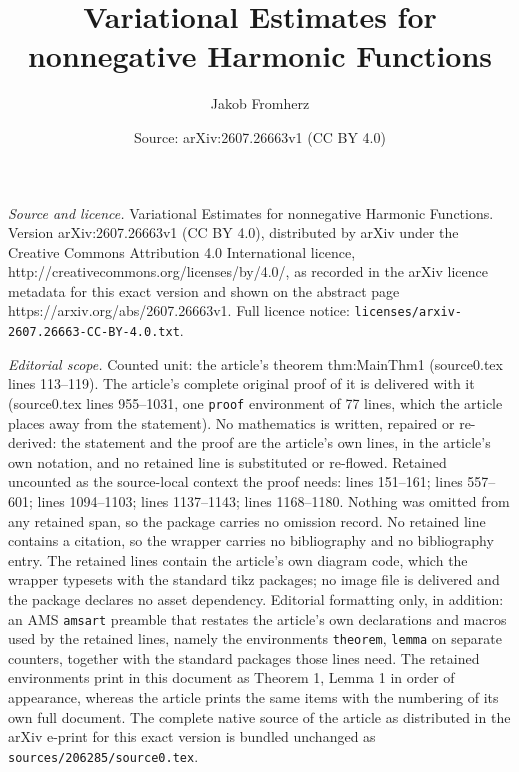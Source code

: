 \documentclass[10pt,a4paper]{amsart}
\title{Variational Estimates for nonnegative Harmonic Functions}
\author{Jakob Fromherz}
\date{Source: arXiv:2607.26663v1 (CC BY 4.0)}
\begin{document}
\maketitle

\noindent\emph{Source and licence.} Variational Estimates for nonnegative Harmonic Functions. Version arXiv:2607.26663v1 (CC BY 4.0), distributed by arXiv under the Creative Commons Attribution 4.0 International licence, http://creativecommons.org/licenses/by/4.0/, as recorded in the arXiv licence metadata for this exact version and shown on the abstract page https://arxiv.org/abs/2607.26663v1. Full licence notice: \texttt{licenses/arxiv-2607.26663-CC-BY-4.0.txt}.\par\smallskip

\noindent\textit{Editorial scope.} Counted unit: the article's theorem thm:MainThm1 (source0.tex lines 113--119). The article's complete original proof of it is delivered with it (source0.tex lines 955--1031, one \texttt{proof} environment of 77 lines, which the article places away from the statement). No mathematics is written, repaired or re-derived: the statement and the proof are the article's own lines, in the article's own notation, and no retained line is substituted or re-flowed.  Retained uncounted as the source-local context the proof needs: lines 151--161; lines 557--601; lines 1094--1103; lines 1137--1143; lines 1168--1180.  Nothing was omitted from any retained span, so the package carries no omission record.  No retained line contains a citation, so the wrapper carries no bibliography and no bibliography entry.  The retained lines contain the article's own diagram code, which the wrapper typesets with the standard tikz packages; no image file is delivered and the package declares no asset dependency.  Editorial formatting only, in addition: an AMS \texttt{amsart} preamble that restates the article's own declarations and macros used by the retained lines, namely the environments \texttt{theorem}, \texttt{lemma} on separate counters, together with the standard packages those lines need.  The retained environments print in this document as Theorem 1, Lemma 1 in order of appearance, whereas the article prints the same items with the numbering of its own full document.  The complete native source of the article as distributed in the arXiv e-print for this exact version is bundled unchanged as \texttt{sources/206285/source0.tex}.
\end{document}
